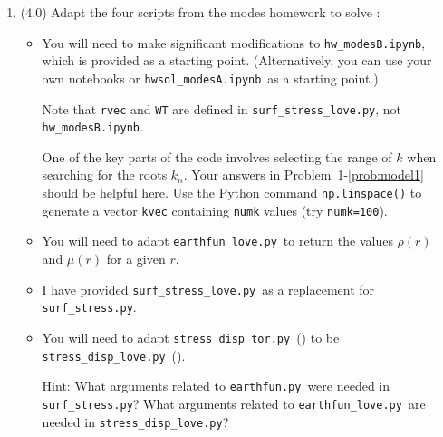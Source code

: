 \documentclass[11pt,titlepage,fleqn]{article}
\newcommand{\tfilemain}{{\tt hwsol\_modesA.ipynb}}
\newcommand{\tfiless}{{\tt surf\_stress.py}}
\newcommand{\tfilesdt}{{\tt stress\_disp\_tor.py}}
\newcommand{\tfileef}{{\tt earthfun.py}}
\newcommand{\tfilemainB}{{\tt hw\_modesB.ipynb}}
\newcommand{\tfilessB}{{\tt surf\_stress\_love.py}}
\newcommand{\tfilesdtB}{{\tt stress\_disp\_love.py}}
\newcommand{\tfileefB}{{\tt earthfun\_love.py}}
\begin{document}

\begin{enumerate}

\item (4.0) Adapt the four scripts from the modes homework to solve :
%
\begin{itemize}
\item You will need to make significant modifications to \tfilemainB, which is provided as a starting point. (Alternatively, you can use your own notebooks or \tfilemain\ as a starting point.)

%
%
Note that \verb+rvec+ and \verb+WT+ are defined in \tfilessB, not \tfilemainB.

One of the key parts of the code involves selecting the range of $k$ when searching for the roots $k_n$.
Your answers in Problem~1-\ref{prob:model1} should be helpful here.
Use the Python command \verb+np.linspace()+ to generate a vector \verb+kvec+ containing \verb+numk+ values (try \verb+numk=100+).

\item You will need to adapt \tfileefB\ to return the values $\rho(r)$ and $\mu(r)$ for a given $r$.

\item I have provided \tfilessB\ as a replacement for \tfiless.

\item You will need to adapt \tfilesdt\ () to be \tfilesdtB\ ().

Hint: What arguments related to \tfileef\ were needed in \tfiless? What arguments related to \tfileefB\ are needed in \tfilesdtB?

\end{itemize}


\end{enumerate}
\end{document}
